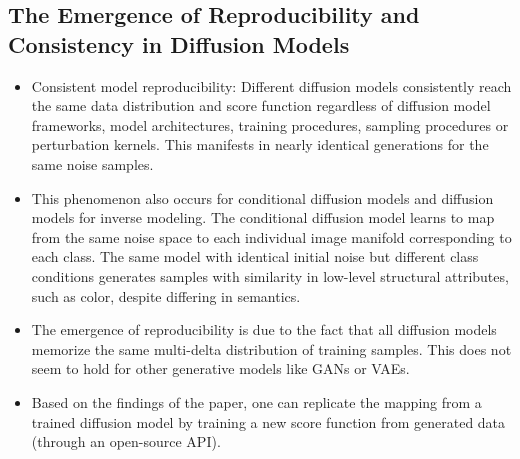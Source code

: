 \documentclass{article}
\begin{document}
\subsection{The Emergence of Reproducibility and Consistency in Diffusion Models}
\begin{tldr}
    \begin{itemize}
        \item Consistent model reproducibility: Different diffusion models consistently reach the same data distribution and score function regardless of diffusion model frameworks, model architectures, training procedures, sampling procedures or perturbation kernels. This manifests in nearly identical generations for the same noise samples.
        \item This phenomenon also occurs for conditional diffusion models and diffusion models for inverse modeling. The conditional diffusion model learns to map from the same noise space to each individual image manifold corresponding to each class. The same model with identical initial noise but different class conditions generates samples with similarity in low-level structural attributes, such as color, despite differing in semantics.
        \item The emergence of reproducibility is due to the fact that all diffusion models memorize the same multi-delta distribution of training samples. This does not seem to hold for other generative models like GANs or VAEs.
        \item Based on the findings of the paper, one can replicate the mapping from a trained diffusion model by training a new score function from generated data (through an open-source API).
    \end{itemize}
\end{tldr}
\end{document}
